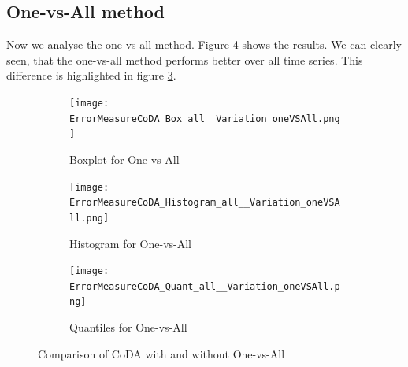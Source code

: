 \subsection{One-vs-All method}
\label{sec: One-vs-All}

Now we analyse the one-vs-all method. Figure \ref{fig:Coda One-vs-All Comp1} shows the results. We can clearly seen, that the one-vs-all method performs better over all time series. This difference is highlighted in figure \ref{fig:Coda One-vs-All Quant}. 

\begin{figure}[htb!]
\centering
\begin{subfigure}[b]{0.45\textwidth}
\texttt{[image: ErrorMeasureCoDA\_Box\_all\_\_Variation\_oneVSAll.png]}
\caption{Boxplot for One-vs-All}
\label{fig:Coda One-vs-All Box}
\end{subfigure}
\hfill
\begin{subfigure}[b]{0.45\textwidth}
\texttt{[image: ErrorMeasureCoDA\_Histogram\_all\_\_Variation\_oneVSAll.png]}
\caption{Histogram for One-vs-All}
\label{fig:Coda One-vs-All Hist}
\end{subfigure}
\hfill
\begin{subfigure}[b]{0.8\textwidth}
\texttt{[image: ErrorMeasureCoDA\_Quant\_all\_\_Variation\_oneVSAll.png]}
\caption{Quantiles for One-vs-All}
\label{fig:Coda One-vs-All Quant}
\end{subfigure}
\caption{Comparison of CoDA with and without One-vs-All}
\label{fig:Coda One-vs-All Comp1}
\end{figure}

















